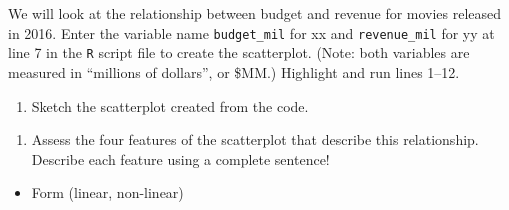 \documentclass[
]{report}
\newenvironment{Shaded}{\begin{snugshade}}{\end{snugshade}}
\newcommand{\CommentTok}[1]{\textcolor[rgb]{0.56,0.35,0.01}{\textit{#1}}}
\newcommand{\DataTypeTok}[1]{\textcolor[rgb]{0.13,0.29,0.53}{#1}}
\newcommand{\KeywordTok}[1]{\textcolor[rgb]{0.13,0.29,0.53}{\textbf{#1}}}
\newcommand{\NormalTok}[1]{#1}
\newcommand{\OperatorTok}[1]{\textcolor[rgb]{0.81,0.36,0.00}{\textbf{#1}}}
\newcommand{\OtherTok}[1]{\textcolor[rgb]{0.56,0.35,0.01}{#1}}
\newcommand{\StringTok}[1]{\textcolor[rgb]{0.31,0.60,0.02}{#1}}
\providecommand{\tightlist}{%
  \setlength{\itemsep}{0pt}\setlength{\parskip}{0pt}}
\begin{document}
\vspace{0.4in}

We will look at the relationship between budget and revenue for movies released in 2016. Enter the variable name \texttt{budget\_mil} for xx and \texttt{revenue\_mil} for yy at line 7 in the \texttt{R} script file to create the scatterplot. (Note: both variables are measured in ``millions of dollars'', or \$MM.) Highlight and run lines 1--12.

\begin{Shaded}
\end{Shaded}

\begin{enumerate}
\def\labelenumi{\arabic{enumi}.}
\setcounter{enumi}{2}
\tightlist
\item
  Sketch the scatterplot created from the code.
\end{enumerate}

\vspace{1.8in}

\begin{enumerate}
\def\labelenumi{\arabic{enumi}.}
\setcounter{enumi}{3}
\tightlist
\item
  Assess the four features of the scatterplot that describe this relationship. Describe each feature using a complete sentence!
\end{enumerate}

\begin{itemize}
\tightlist
\item
  Form (linear, non-linear)
\end{itemize}
\end{document}
